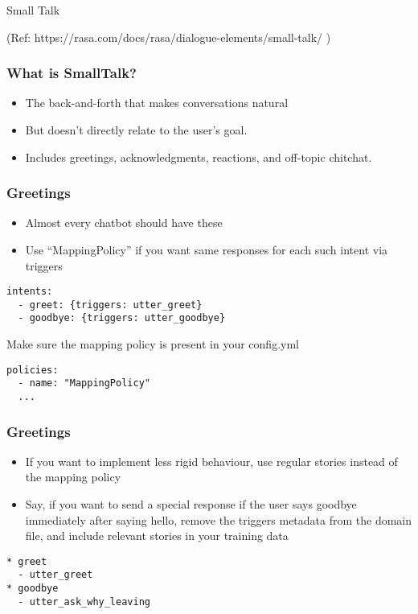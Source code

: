 \begin{frame}[fragile]\frametitle{}
\begin{center}
{\Large Small Talk}

{\tiny (Ref: https://rasa.com/docs/rasa/dialogue-elements/small-talk/ )}
\end{center}
\end{frame}

 \begin{frame}[fragile]\frametitle{What is SmallTalk?}
\begin{itemize}
\item The back-and-forth that makes conversations natural
\item But doesn’t directly relate to the user’s goal.
\item Includes greetings, acknowledgments, reactions, and off-topic chitchat.
\end{itemize}
\end{frame}

 \begin{frame}[fragile]\frametitle{Greetings}
\begin{itemize}
\item Almost every chatbot should have these
\item Use ``MappingPolicy'' if you want same responses for each such intent via triggers
\end{itemize}

\begin{lstlisting}
intents:
  - greet: {triggers: utter_greet}
  - goodbye: {triggers: utter_goodbye}
\end{lstlisting}

Make sure the mapping policy is present in your config.yml

\begin{lstlisting}
policies:
  - name: "MappingPolicy"
  ...
\end{lstlisting}

\end{frame}

 \begin{frame}[fragile]\frametitle{Greetings}
\begin{itemize}
\item If you want to implement less rigid behaviour, use regular stories instead of the mapping policy
\item Say, if you want to send a special response if the user says goodbye immediately after saying hello, remove the triggers metadata from the domain file, and include relevant stories in your training data
\end{itemize}

\begin{lstlisting}
* greet
  - utter_greet
* goodbye
  - utter_ask_why_leaving
\end{lstlisting}

\end{frame}

